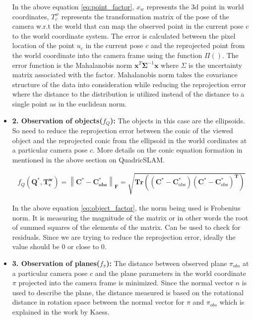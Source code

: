 \documentclass{article}
\begin{document}
\begin{itemize}
In the above equation \ref{eq:point_factor}, $x_{w}$ represents the 3d point in world coordinates, $T_{c}^{w}$ represents the transformation matrix of the pose of the camera w.r.t the world that can map the observed point in the current pose c to the world coordinate system. The error is calculated between the pixel location of the point $u_{c}$ in the current pose $c$ and the reprojected point from the world coordinate into the camera frame using the function $\Pi()$. The error function is the Mahalanobis norm $\mathbf{x}^{T} \boldsymbol{\Sigma}^{-1} \mathbf{x}$ where $\Sigma$ is the uncertainty matrix associated with the factor. Mahalanobis norm takes the covariance structure of the data into consideration while reducing the reprojection error where the distance to the distribution is utilized instead of the distance to a single point as in the euclidean norm.

\item \textbf{2. Observation of objects($f_{Q}$): } The objects in this case are the ellipsoids. So need to reduce the reprojection error between the conic of the viewed object and the reprojected conic from the ellipsoid in the world cordinates at a particular camera pose $c$. More details on the conic equation formation in mentioned in the above section on QuadricSLAM.

\begin{equation}
{
\begin{aligned}
f_{Q}\left(\mathbf{Q}^{*}, \mathbf{T}_{\mathbf{c}}^{\mathbf{w}}\right)=\left\|\mathbf{C}^{*}-\mathbf{C}_{\mathbf{o b s}}^{*}\right\|_{\mathbf{F}}=\sqrt{\mathbf{T r}\left(\left(\mathbf{C}^{*}-\mathbf{C}_{\mathrm{obs}}^{*}\right)\left(\mathbf{C}^{*}-\mathbf{C}_{\mathrm{obs}}^{*}\right)^{\mathbf{T}}\right)}
\end{aligned}
} \label{eq:object_factor}
\end{equation}

In the above equation \ref{eq:object_factor}, the norm being used is Frobenius norm. It is measuring the magnitude of the matrix or in other words the root of summed squares of the elements of the matrix. Can be used to check for residuals. Since we are trying to reduce the reprojection error, ideally the value should be 0 or close to 0.

\item \textbf{3. Observation of planes($f_{\pi}$): } The distance between observed plane $\pi_{obs}$ at a particular camera pose $c$ and the plane parameters in the world coordinate $\pi$ projected into the camera frame is minimized. Since the normal vector $n$ is used to describe the plane, the distance measured is based on the rotational distance in rotation space between the normal vector for $\pi$ and $\pi_{obs}$ which is explained in the work by Kaess\cite{infiniteplanes}.


\end{itemize}
\end{document}
